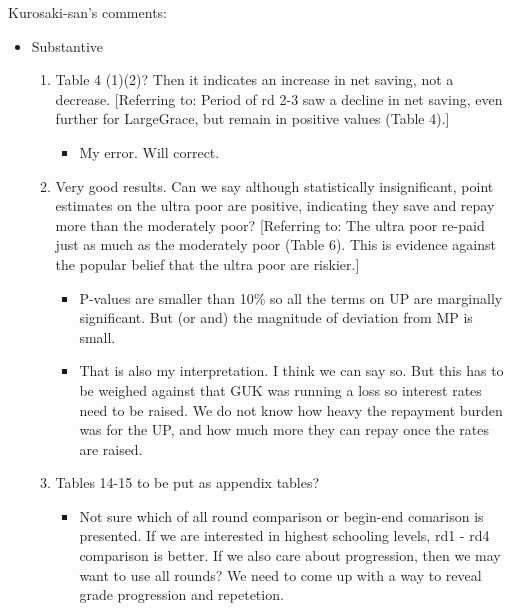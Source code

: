 Kurosaki-san's comments:
\begin{itemize}
\vspace{1.0ex}\setlength{\itemsep}{1.0ex}\setlength{\baselineskip}{12pt}
\item	Substantive
\begin{enumerate}
\vspace{1.0ex}\setlength{\itemsep}{1.0ex}\setlength{\baselineskip}{12pt}
\item	Table 4 (1)(2)? Then it indicates an increase in net saving, not a decrease. [Referring to: Period of rd 2-3 saw a decline in net saving, even further for LargeGrace, but remain in positive values (Table 4).]
	\begin{itemize}
	\vspace{1.0ex}\setlength{\itemsep}{1.0ex}\setlength{\baselineskip}{12pt}
	\item	My error. Will correct.
	\end{itemize}
\item	Very good results. Can we say although statistically insignificant, point estimates on the ultra poor are positive, indicating they save and repay more than the moderately poor? [Referring to: The ultra poor re-paid just as much as the moderately poor (Table 6). This is evidence against the popular belief that the ultra poor are riskier.]
	\begin{itemize}
	\vspace{1.0ex}\setlength{\itemsep}{1.0ex}\setlength{\baselineskip}{12pt}
	\item	P-values are smaller than 10\% so all the terms on UP are marginally significant. But (or and) the magnitude of deviation from MP is small.
	\item	That is also my interpretation. I think we can say so. But this has to be weighed against that GUK was running a loss so interest rates need to be raised. We do not know how heavy the repayment burden was for the UP, and how much more they can repay once the rates are raised.
	\end{itemize}
\item	Tables 14-15 to be put as appendix tables?
	\begin{itemize}
	\vspace{1.0ex}\setlength{\itemsep}{1.0ex}\setlength{\baselineskip}{12pt}
	\item	Not sure which of all round comparison or begin-end comarison is presented. If we are interested in highest schooling levels, rd1 - rd4 comparison is better. If we also care about progression, then we may want to use all rounds? We need to come up with a way to reveal grade progression and repetetion.

\end{itemize}
\end{enumerate}
\end{itemize}
